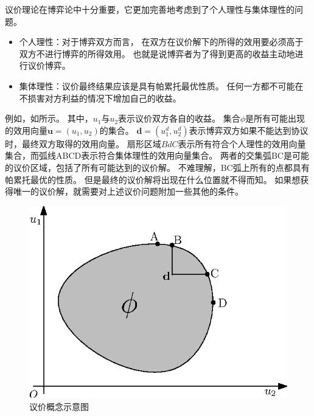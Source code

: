 议价理论在博弈论中十分重要，它更加完善地考虑到了个人理性与集体理性的问题。
\begin{itemize}
\item 个人理性：对于博弈双方而言，
在双方在议价解下的所得的效用要必须高于双方不进行博弈的所得效用。
也就是说博弈者为了得到更高的收益主动地进行议价博弈。
\item 集体理性：议价最终结果应该是具有帕累托最优性质。
任何一方都不可能在不损害对方利益的情况下增加自己的收益。
\end{itemize}
例如，如所示。
其中，$u_1$与$u_2$表示议价双方各自的收益。
集合$\phi$是所有可能出现的效用向量$\mathbf{u}=(u_1,u_2)$的集合。
$\mathbf{d}=(u_1^d, u_2^d)$表示博弈双方如果不能达到协议时，最终双方取得的效用向量。
扇形区域$BdC$表示所有符合个人理性的效用向量集合，而弧线ABCD表示符合集体理性的效用向量集合。
两者的交集弧BC是可能的议价区域，包括了所有可能达到的议价解。
不难理解，BC弧上所有的点都具有帕累托最优的性质。
但是最终的议价解将出现在什么位置就不得而知。
如果想获得唯一的议价解，就需要对上述议价问题附加一些其他的条件。
\begin{figure}[!tb] 
    \centering
   \begin{minipage}[t]{0.5\linewidth} 
    \centering 
    \includegraphics[width = \textwidth]{bargain_basic_concept} 
    \caption{议价概念示意图} 
    \label{fig:chap_bargain:bargain_basic_concept} 
  \end{minipage}%
\end{figure}

